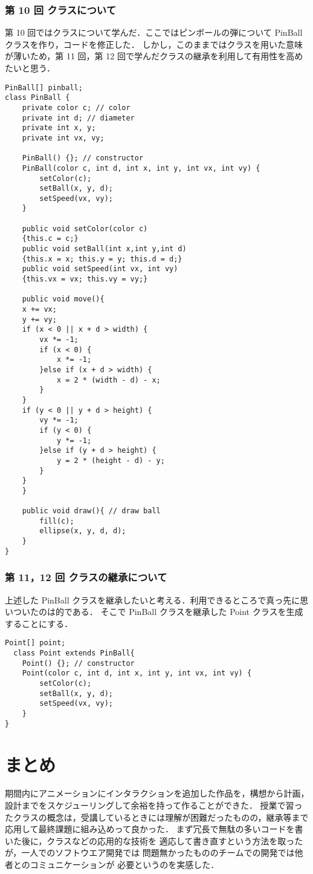 \documentclass[12pt,a4j]{jarticle}
\begin{document}
\subsubsection{第 10 回 クラスについて}
第 10 回ではクラスについて学んだ．ここではピンボールの弾について PinBall クラスを作り，コードを修正した．
しかし，このままではクラスを用いた意味が薄いため，第 11 回，第 12 回で学んだクラスの継承を利用して有用性を高めたいと思う．
\begin{lstlisting}
PinBall[] pinball;
class PinBall {
	private color c; // color
	private int d; // diameter
	private int x, y;
	private int vx, vy;

	PinBall() {}; // constructor
	PinBall(color c, int d, int x, int y, int vx, int vy) { 
        setColor(c);
        setBall(x, y, d);
        setSpeed(vx, vy);
	}

    public void setColor(color c)
    {this.c = c;}
    public void setBall(int x,int y,int d)
    {this.x = x; this.y = y; this.d = d;}
    public void setSpeed(int vx, int vy)
    {this.vx = vx; this.vy = vy;}

	public void move(){
    x += vx;
    y += vy;
    if (x < 0 || x + d > width) {
        vx *= -1;
        if (x < 0) {
            x *= -1;
        }else if (x + d > width) {
            x = 2 * (width - d) - x;
        }
    }
    if (y < 0 || y + d > height) {
        vy *= -1;
        if (y < 0) {
            y *= -1;
        }else if (y + d > height) {
            y = 2 * (height - d) - y;
        }
    }
	}

	public void draw(){ // draw ball
		fill(c);
		ellipse(x, y, d, d);
	}
}
\end{lstlisting}

\subsubsection{第 11，12 回 クラスの継承について}
上述した PinBall クラスを継承したいと考える．利用できるところで真っ先に思いついたのは的である．
そこで PinBall クラスを継承した Point クラスを生成することにする．

\begin{lstlisting}
Point[] point;
  class Point extends PinBall{
	Point() {}; // constructor
	Point(color c, int d, int x, int y, int vx, int vy) {
        setColor(c);
        setBall(x, y, d);
        setSpeed(vx, vy);
	}
}
\end{lstlisting}

\section{まとめ}
期間内にアニメーションにインタラクションを追加した作品を，構想から計画，設計までをスケジューリングして余裕を持って作ることができた．
授業で習ったクラスの概念は，受講しているときには理解が困難だったものの，継承等まで
応用して最終課題に組み込めって良かった．
まず冗長で無駄の多いコードを書いた後に，クラスなどの応用的な技術を
適応して書き直すという方法を取ったが，一人でのソフトウエア開発では
問題無かったもののチームでの開発では他者とのコミュニケーションが
必要というのを実感した．
\end{document}
